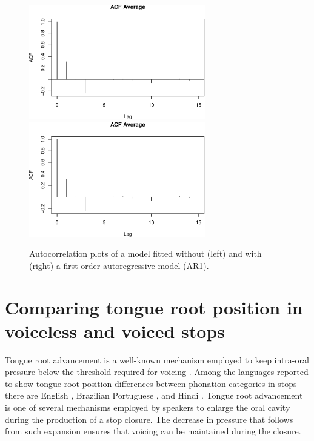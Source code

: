 \documentclass[
  11pt,
]{article}
\begin{document}
\begin{figure}

{\centering \includegraphics[width=.7\linewidth,height=5cm]{2018-polar-gam_files/figure-latex/Figure06} \includegraphics[width=.7\linewidth,height=5cm]{2018-polar-gam_files/figure-latex/Figure06} 

}

\caption{Autocorrelation plots of a model fitted without (left) and with (right) a first-order autoregressive model (AR1).}\label{f:Figure06}
\end{figure}

\hypertarget{comparing-tongue-root-position-in-voiceless-and-voiced-stops}{%
\section{Comparing tongue root position in voiceless and voiced
stops}\label{comparing-tongue-root-position-in-voiceless-and-voiced-stops}}

Tongue root advancement is a well-known mechanism employed to keep
intra-oral pressure below the threshold required for voicing
\citep{ohala2011, kent1969, perkell1969, westbury1983, ahn2018}. Among
the languages reported to show tongue root position differences between
phonation categories in stops there are English
\citep{westbury1983, ahn2018}, Brazilian Portuguese \citep{ahn2018}, and
Hindi \citep{ahn2016a}. Tongue root advancement is one of several
mechanisms employed by speakers to enlarge the oral cavity during the
production of a stop closure. The decrease in pressure that follows from
such expansion ensures that voicing can be maintained during the
closure.
\end{document}
